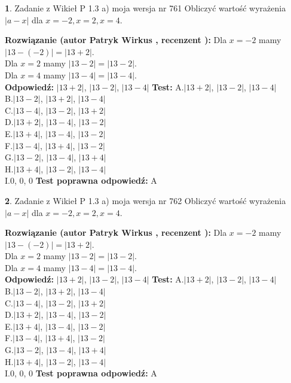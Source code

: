 \documentclass[12pt, a4paper]{article}
\theoremstyle{definition} %
\newtheorem{zad}{}
\newcommand{\zadStart}[1]{\begin{zad}#1\newline}
\newcommand{\zadStop}{\end{zad}}
\newcommand{\rozwStart}[2]{\noindent \textbf{Rozwiązanie (autor #1 , recenzent #2): }\newline}
\newcommand{\rozwStop}{\newline}
\newcommand{\odpStart}{\noindent \textbf{Odpowiedź:}\newline}
\newcommand{\odpStop}{\newline}
\newcommand{\testStart}{\noindent \textbf{Test:}\newline}
\newcommand{\testStop}{\newline}
\newcommand{\kluczStart}{\noindent \textbf{Test poprawna odpowiedź:}\newline}
\newcommand{\kluczStop}{\newline}
\begin{document}
\zadStart{Zadanie z Wikieł P 1.3 a) moja wersja nr 761}
Obliczyć wartość wyrażenia $|a - x|$ dla $x=-2,x=2,x=4$.
\zadStop
\rozwStart{Patryk Wirkus}{}
Dla $x = -2$ mamy $|13 - (-2)| = |13 + 2|$.\\
Dla $x = 2$ mamy $|13 - 2| = |13 - 2|$.\\
Dla $x = 4$ mamy $|13 - 4| = |13 - 4|$.\\
\rozwStop
\odpStart
$|13 + 2|$, $|13 - 2|$, $|13 - 4|$
\odpStop
\testStart
A.$|13 + 2|$, $|13 - 2|$, $|13 - 4|$\\
B.$|13 - 2|$, $|13 + 2|$, $|13 - 4|$\\
C.$|13 - 4|$, $|13 - 2|$, $|13 + 2|$\\
D.$|13 + 2|$, $|13 - 4|$, $|13 - 2|$\\
E.$|13 + 4|$, $|13 - 4|$, $|13 - 2|$\\
F.$|13 - 4|$, $|13 + 4|$, $|13 - 2|$\\
G.$|13 - 2|$, $|13 - 4|$, $|13 + 4|$\\
H.$|13 + 4|$, $|13 - 2|$, $|13 - 4|$\\
I.$0$, $0$, $0$
\testStop
\kluczStart
A
\kluczStop



\zadStart{Zadanie z Wikieł P 1.3 a) moja wersja nr 762}
Obliczyć wartość wyrażenia $|a - x|$ dla $x=-2,x=2,x=4$.
\zadStop
\rozwStart{Patryk Wirkus}{}
Dla $x = -2$ mamy $|13 - (-2)| = |13 + 2|$.\\
Dla $x = 2$ mamy $|13 - 2| = |13 - 2|$.\\
Dla $x = 4$ mamy $|13 - 4| = |13 - 4|$.\\
\rozwStop
\odpStart
$|13 + 2|$, $|13 - 2|$, $|13 - 4|$
\odpStop
\testStart
A.$|13 + 2|$, $|13 - 2|$, $|13 - 4|$\\
B.$|13 - 2|$, $|13 + 2|$, $|13 - 4|$\\
C.$|13 - 4|$, $|13 - 2|$, $|13 + 2|$\\
D.$|13 + 2|$, $|13 - 4|$, $|13 - 2|$\\
E.$|13 + 4|$, $|13 - 4|$, $|13 - 2|$\\
F.$|13 - 4|$, $|13 + 4|$, $|13 - 2|$\\
G.$|13 - 2|$, $|13 - 4|$, $|13 + 4|$\\
H.$|13 + 4|$, $|13 - 2|$, $|13 - 4|$\\
I.$0$, $0$, $0$
\testStop
\kluczStart
A
\kluczStop
\end{document}
